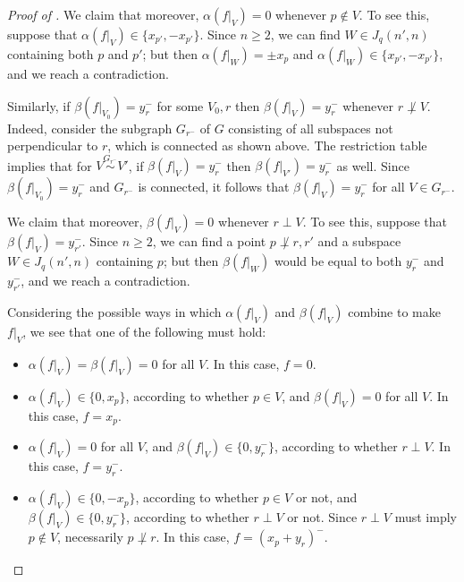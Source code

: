 \documentclass[10pt,a4paper]{amsart}
\begin{document}
\begin{proof}[Proof of ]
We claim that moreover, $\alpha(f|_V) = 0$ whenever $p \notin V$. To see this, suppose that $\alpha(f|_V) \in \{ x_{p'}, -x_{p'} \}$. Since $n \ge 2$, we can find $W \in J_q(n',n)$ containing both $p$ and $p'$; but then $\alpha(f|_W) = \pm x_p$ and $\alpha(f|_W) \in \{x_{p'}, -x_{p'}\}$, and we reach a contradiction.

Similarly, if $\beta(f|_{V_0}) = y_r^-$ for some $V_0,r$ then $\beta(f|_V) = y_r^-$ whenever $r \not\perp V$.
Indeed, consider the subgraph $G_{r^-}$ of $G$ consisting of all subspaces not perpendicular to $r$, which is connected as shown above. The restriction table implies that for $V \stackrel{G_{r^-}}\sim V'$, if $\beta(f|_V) = y_r^-$ then $\beta(f|_{V'}) = y_r^-$ as well. Since $\beta(f|_{V_0}) = y_r^-$ and $G_{r^-}$ is connected, it follows that $\beta(f|_V) = y_r^-$ for all $V \in G_{r^-}$.

We claim that moreover, $\beta(f|_V) = 0$ whenever $r \perp V$. To see this, suppose that $\beta(f|_V) = y_{r'}^-$. Since $n \ge 2$, we can find a point $p \not\perp r,r'$ and a subspace $W \in J_q(n',n)$ containing $p$; but then $\beta(f|_W)$ would be equal to both $y_r^-$ and $y_{r'}^-$, and we reach a contradiction.

Considering the possible ways in which $\alpha(f|_V)$ and $\beta(f|_V)$ combine to make $f|_V$, we see that one of the following must hold:
\begin{itemize}
\item $\alpha(f|_V) = \beta(f|_V) = 0$ for all $V$. In this case, $f = 0$.
\item $\alpha(f|_V) \in \{0, x_p\}$, according to whether $p \in V$, and $\beta(f|_V) = 0$ for all $V$. In this case, $f = x_p$.
\item $\alpha(f|_V) = 0$ for all $V$, and $\beta(f|_V) \in \{0, y_r^-\}$, according to whether $r \perp V$. In this case, $f = y_r^-$.
\item $\alpha(f|_V) \in \{0, -x_p\}$, according to whether $p \in V$ or not, and $\beta(f|_V) \in \{0, y_r^-\}$, according to whether $r \perp V$ or not. Since $r \perp V$ must imply $p \notin V$, necessarily $p \not\perp r$. In this case, $f = (x_p + y_r)^-$. \qedhere
\end{itemize}
\end{proof}
\end{document}
